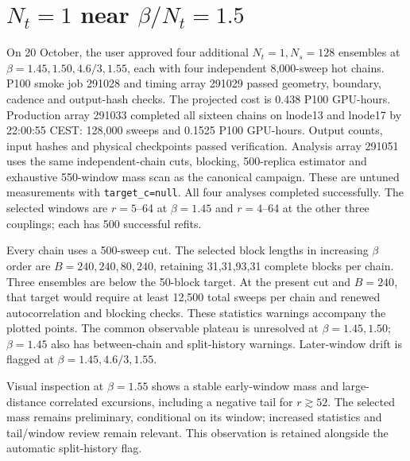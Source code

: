 \documentclass[11pt,a4paper]{article}
\begin{document}
\clearpage\section*{$N_t=1$ near $\beta/N_t=1.5$}
On 20 October, the user approved four additional $N_t=1,N_s=128$ ensembles
at $\beta=1.45,1.50,4.6/3,1.55$, each with four independent 8,000-sweep hot
chains. P100 smoke job 291028 and timing array 291029 passed geometry,
boundary, cadence and output-hash checks. The projected cost is 0.438 P100
GPU-hours. Production array 291033 completed all sixteen chains on lnode13
and lnode17 by 22:00:55 CEST: 128,000 sweeps and 0.1525 P100 GPU-hours.
Output counts, input hashes and physical checkpoints passed verification.
Analysis array 291051 uses the same independent-chain cuts, blocking,
500-replica estimator and exhaustive 550-window mass scan as the canonical
campaign. These are untuned measurements with \texttt{target\_c=null}.
All four analyses completed successfully. The selected windows are
$r=5$--64 at $\beta=1.45$ and $r=4$--64 at the other three couplings;
each has 500 successful refits.

\begin{center}\small\end{center}

Every chain uses a 500-sweep cut. The selected block lengths in increasing
$\beta$ order are $B=240,240,80,240$, retaining 31,31,93,31 complete blocks
per chain. Three ensembles are below the 50-block target. At the present
cut and $B=240$, that target would require at least 12,500 total sweeps per
chain and renewed autocorrelation and blocking checks. These statistics
warnings accompany the plotted points.
The common observable plateau is unresolved at $\beta=1.45,1.50$;
$\beta=1.45$ also has between-chain and split-history warnings.
Later-window drift is flagged at $\beta=1.45,4.6/3,1.55$.

Visual inspection at $\beta=1.55$ shows a stable early-window mass and
large-distance correlated excursions, including a negative tail for
$r\gtrsim52$. The selected mass remains preliminary, conditional on its
window; increased statistics and tail/window review remain relevant.
This observation is retained alongside the automatic split-history flag.
\end{document}
